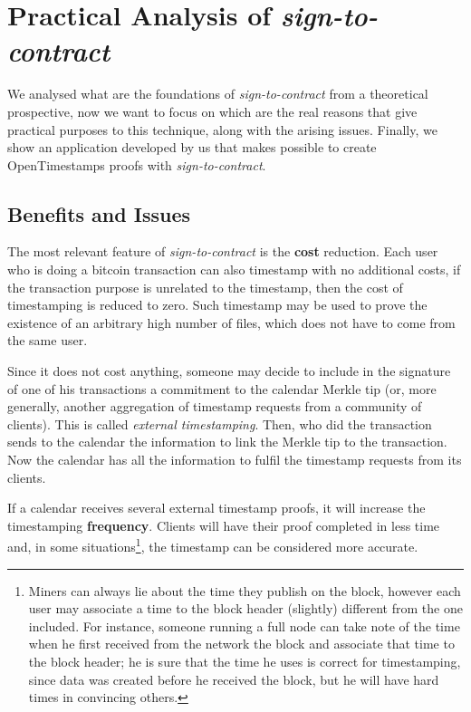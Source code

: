 \chapter{Practical Analysis of \textit{sign-to-contract} }
\label{chpr:s2c}
We analysed what are the foundations of \textit{sign-to-contract} from a theoretical prospective, now we want to focus on which are the real reasons that give practical purposes to this technique, along with the arising issues.
Finally, we show an application developed by us that makes possible to create OpenTimestamps proofs with \textit{sign-to-contract}.

\section{Benefits and Issues}
The most relevant feature of \textit{sign-to-contract} is the \textbf{cost} reduction. Each user who is doing a bitcoin transaction can also timestamp with no additional costs, if the transaction purpose is unrelated to the timestamp, then the cost of timestamping is reduced to zero. Such timestamp may be used to prove the existence of an arbitrary high number of files, which does not have to come from the same user.

Since it does not cost anything, someone may decide to include in the signature of one of his transactions a commitment to the calendar Merkle tip (or, more generally, another aggregation of timestamp requests from a community of clients). 
This is called \textit{external timestamping}.
Then, who did the transaction sends to the calendar the information to link the Merkle tip to the transaction.
Now the calendar has all the information to fulfil the timestamp requests from its clients.

If a calendar receives several external timestamp proofs, it will increase the timestamping \textbf{frequency}. 
Clients will have their proof completed in less time and, in some situations\footnote{Miners can always lie about the time they publish on the block, however each user may associate a time to the block header (slightly) different from the one included. For instance, someone running a full node can take note of the time when he first received from the network the block and associate that time to the block header; he is sure that the time he uses is correct for timestamping, since data was created before he received the block, but he will have hard times in convincing others.}, the timestamp can be considered more accurate.

